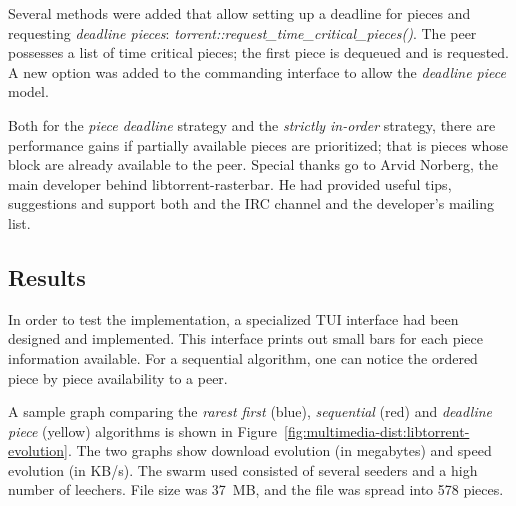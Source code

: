 Several methods were added that allow setting up a deadline for pieces and
requesting \textit{deadline pieces}:
\textit{torrent::request\_time\_critical\_pieces()}. The peer possesses a list
of time critical pieces; the first piece is dequeued and is requested. A new
option was added to the commanding interface to allow the \textit{deadline
piece} model.

Both for the \textit{piece deadline} strategy and the \textit{strictly
in-order} strategy, there are performance gains if partially available pieces
are prioritized; that is pieces whose block are already available to the peer.
Special thanks go to Arvid Norberg, the main developer behind
libtorrent-rasterbar. He had provided useful tips, suggestions and support
both and the IRC channel and the developer's mailing list.

\subsection{Results}
\label{subsec:multimedia-dist:libtorrent-results}

In order to test the implementation, a specialized TUI interface had been
designed and implemented. This interface prints out small bars for each piece
information available. For a sequential algorithm, one can notice the ordered
piece by piece availability to a peer.

A sample graph comparing the \textit{rarest first} (blue), \textit{sequential}
(red) and \textit{deadline piece} (yellow) algorithms is shown in
Figure~\ref{fig:multimedia-dist:libtorrent-evolution}. The two
graphs show download evolution (in megabytes) and speed evolution (in KB/s).
The swarm used consisted of several seeders and a high number of leechers.
File size was 37~MB, and the file was spread into 578 pieces.

